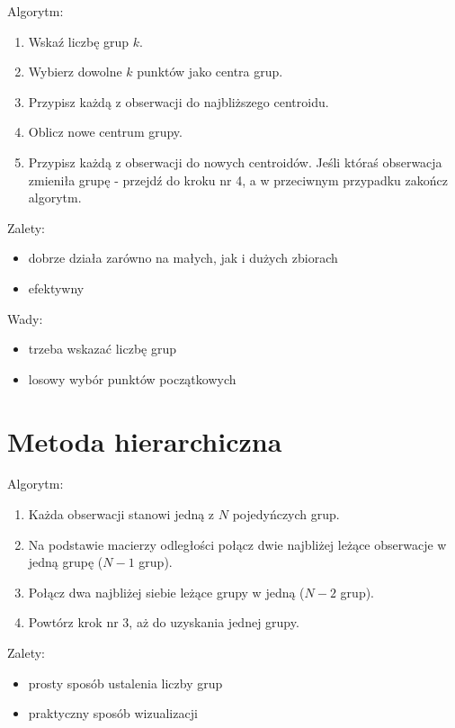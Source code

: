 \documentclass[]{book}
\providecommand{\tightlist}{%
  \setlength{\itemsep}{0pt}\setlength{\parskip}{0pt}}
\begin{document}
Algorytm:

\begin{enumerate}
\def\labelenumi{\arabic{enumi}.}
\tightlist
\item
  Wskaź liczbę grup \(k\).
\item
  Wybierz dowolne \(k\) punktów jako centra grup.
\item
  Przypisz każdą z obserwacji do najbliższego centroidu.
\item
  Oblicz nowe centrum grupy.
\item
  Przypisz każdą z obserwacji do nowych centroidów. Jeśli któraś
  obserwacja zmieniła grupę - przejdź do kroku nr 4, a w przeciwnym
  przypadku zakończ algorytm.
\end{enumerate}

Zalety:

\begin{itemize}
\tightlist
\item
  dobrze działa zarówno na małych, jak i dużych zbiorach
\item
  efektywny
\end{itemize}

Wady:

\begin{itemize}
\tightlist
\item
  trzeba wskazać liczbę grup
\item
  losowy wybór punktów początkowych
\end{itemize}

\section{Metoda hierarchiczna}\label{metoda-hierarchiczna}

Algorytm:

\begin{enumerate}
\def\labelenumi{\arabic{enumi}.}
\tightlist
\item
  Każda obserwacji stanowi jedną z \(N\) pojedyńczych grup.
\item
  Na podstawie macierzy odległości połącz dwie najbliżej leżące
  obserwacje w jedną grupę (\(N-1\) grup).
\item
  Połącz dwa najbliżej siebie leżące grupy w jedną (\(N-2\) grup).
\item
  Powtórz krok nr 3, aż do uzyskania jednej grupy.
\end{enumerate}

Zalety:

\begin{itemize}
\tightlist
\item
  prosty sposób ustalenia liczby grup
\item
  praktyczny sposób wizualizacji
\end{itemize}
\end{document}
